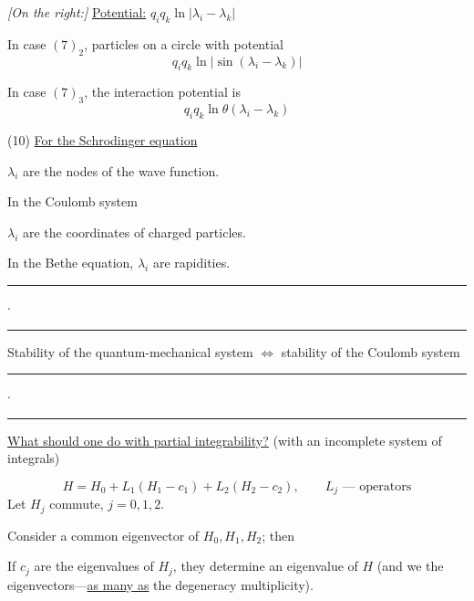 \textit{[On the right:]} \underline{Potential:}
$q_iq_k\ln|\lambda_i-\lambda_k|$

In case $(7)_2$,
particles on a circle with potential
\begin{equation*}
q_iq_k\ln|\sin(\lambda_i-\lambda_k)|
\end{equation*}

In case $(7)_3$, the interaction potential is
\begin{equation*}
q_iq_k\ln\theta(\lambda_i-\lambda_k)
\end{equation*}

(10) \underline{For the Schrodinger equation}

$\lambda_i$ are the nodes of the wave function.

In the Coulomb system

$\lambda_i$ are the coordinates of charged particles.

In the Bethe equation, $\lambda_i$ are rapidities.

\begin{center}
\rule{2cm}{0.4pt}\quad$\cdot$\quad\rule{2cm}{0.4pt}
\end{center}

Stability of the quantum-mechanical system $\Leftrightarrow$ stability of the Coulomb system

\begin{center}
\rule{2cm}{0.4pt}\quad$\cdot$\quad\rule{2cm}{0.4pt}
\end{center}

\underline{What should one do with partial integrability?}
(with an incomplete system of integrals)

\begin{equation*}
H=H_0+L_1(H_1-c_1)+L_2(H_2-c_2),
\qquad L_j\text{ --- operators}
\tag{11}
\end{equation*}
Let $H_j$ commute, $j=0,1,2$.


Consider a common eigenvector of $H_0,H_1,H_2$; then

If $c_j$ are the eigenvalues of $H_j$, they determine an eigenvalue of
 $H$
(and we  the eigenvectors---\underline{as many as} the degeneracy multiplicity).

